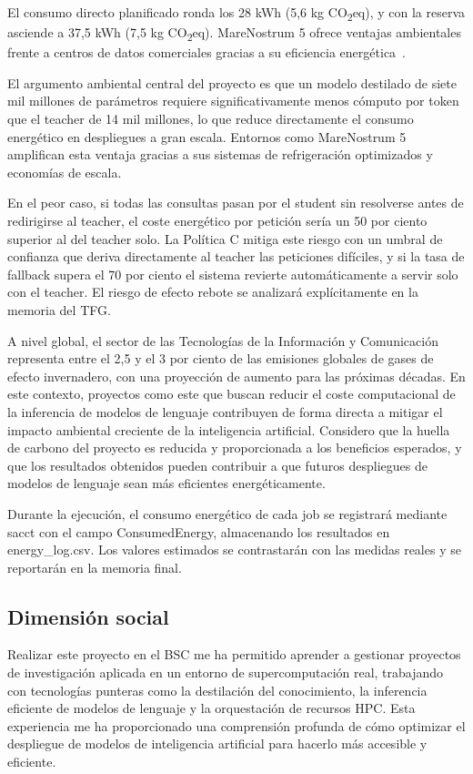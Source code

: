 El consumo directo planificado ronda los 28 kWh (5,6 kg CO\textsubscript{2}eq), y con la reserva asciende a 37,5 kWh (7,5 kg CO\textsubscript{2}eq). MareNostrum 5 ofrece ventajas ambientales frente a centros de datos comerciales gracias a su eficiencia energética~\cite{mn5}.

El argumento ambiental central del proyecto es que un modelo destilado de siete mil millones de parámetros requiere significativamente menos cómputo por token que el teacher de 14 mil millones, lo que reduce directamente el consumo energético en despliegues a gran escala. Entornos como MareNostrum 5 amplifican esta ventaja gracias a sus sistemas de refrigeración optimizados y economías de escala.

En el peor caso, si todas las consultas pasan por el student sin resolverse antes de redirigirse al teacher, el coste energético por petición sería un 50 por ciento superior al del teacher solo. La Política C mitiga este riesgo con un umbral de confianza que deriva directamente al teacher las peticiones difíciles, y si la tasa de fallback supera el 70 por ciento el sistema revierte automáticamente a servir solo con el teacher. El riesgo de efecto rebote se analizará explícitamente en la memoria del TFG.

A nivel global, el sector de las Tecnologías de la Información y Comunicación representa entre el 2,5 y el 3 por ciento de las emisiones globales de gases de efecto invernadero, con una proyección de aumento para las próximas décadas. En este contexto, proyectos como este que buscan reducir el coste computacional de la inferencia de modelos de lenguaje contribuyen de forma directa a mitigar el impacto ambiental creciente de la inteligencia artificial. Considero que la huella de carbono del proyecto es reducida y proporcionada a los beneficios esperados, y que los resultados obtenidos pueden contribuir a que futuros despliegues de modelos de lenguaje sean más eficientes energéticamente.

Durante la ejecución, el consumo energético de cada job se registrará mediante sacct con el campo ConsumedEnergy, almacenando los resultados en energy\_log.csv. Los valores estimados se contrastarán con las medidas reales y se reportarán en la memoria final.

\subsection{Dimensión social}

Realizar este proyecto en el BSC me ha permitido aprender a gestionar proyectos de investigación aplicada en un entorno de supercomputación real, trabajando con tecnologías punteras como la destilación del conocimiento, la inferencia eficiente de modelos de lenguaje y la orquestación de recursos HPC. Esta experiencia me ha proporcionado una comprensión profunda de cómo optimizar el despliegue de modelos de inteligencia artificial para hacerlo más accesible y eficiente.

